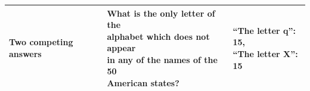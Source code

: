 \begin{table}[h]
\begin{tabular}{|l|l|l|}
\midrule
Two competing answers & \makecell[l]{What is the only letter of the \\ alphabet which does  not appear \\ in any of the names of the 50 \\ American states?} & \makecell[l]{``\textbf{The letter q}'': 15, \\ ``The letter X'': 15}\\
\bottomrule
\end{tabular}
\label{tab:error_types_triviaqa}
\end{table}